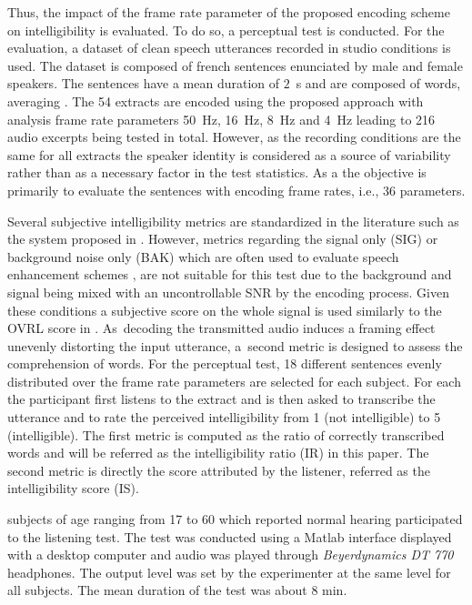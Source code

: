 \documentclass[sensors,article,accept,moreauthors,pdftex,10pt,a4paper]{mdpi}
\begin{document}
Thus, the impact of the frame rate parameter of the proposed encoding scheme on intelligibility is evaluated. To do so, a perceptual test is conducted. For the evaluation, a dataset of clean speech utterances recorded in studio conditions is used. The dataset is composed of  french sentences enunciated by  male and  female speakers. The sentences have a mean duration of $2$~s and are composed of  words, averaging . The 54 extracts are encoded using the proposed approach with  analysis frame rate parameters  50~Hz, 16~Hz, 8~Hz and 4~Hz leading to 216 audio excerpts being tested in total. However, as the recording conditions are the same for all extracts the speaker identity is considered as a source of variability rather than as a necessary factor in the test statistics. As a  the objective is primarily to evaluate the  sentences with  encoding frame rates, i.e., 36 parameters.

Several subjective intelligibility metrics are standardized in the literature such as the system proposed in \cite{itup835}. However, metrics regarding the signal only (SIG) or background noise only (BAK) which are often used to evaluate speech enhancement schemes \citep{ntalampiras2008}, are not suitable for this test due to the background and signal being mixed with an uncontrollable SNR by the encoding process. Given these conditions a subjective score on the whole signal is used similarly to the OVRL score in \cite{itup835}. As~decoding the transmitted audio induces a framing effect unevenly distorting the input utterance, a~second metric is designed to assess the comprehension of words. For the perceptual test, 18 different sentences evenly distributed over the  frame rate parameters are selected for each subject. For each  the participant first listens to the extract and is then asked to transcribe the utterance and to rate the perceived intelligibility from 1 (not intelligible) to 5 (intelligible). The first metric is computed as the ratio of correctly transcribed words and will be referred as the intelligibility ratio (IR) in this paper. The second metric is directly the score attributed by the listener, referred as the intelligibility score (IS).

 subjects of age ranging from 17 to 60 which reported normal hearing participated to the listening test. The test was conducted using a Matlab interface displayed with a desktop computer and audio was played through \textit{Beyerdynamics DT 770} headphones. The output level was set by the experimenter at the same level for all subjects. The mean duration of the test was about 8 min.
\end{document}

